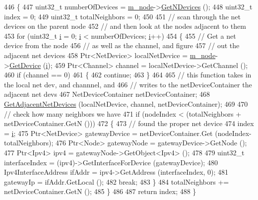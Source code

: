 \begin{DoxyCode}
446 \{
447   uint32\_t numberOfDevices = \hyperlink{classns3_1_1Ipv4NixVectorRouting_a329265b09f4d85bac6ec9bd0ec2daa92}{m\_node}->\hyperlink{classns3_1_1Node_a531554d2241ba4fa1cd74e3360be6bce}{GetNDevices} ();
448   uint32\_t index = 0;
449   uint32\_t totalNeighbors = 0;
450 
451   \textcolor{comment}{// scan through the net devices on the parent node}
452   \textcolor{comment}{// and then look at the nodes adjacent to them}
453   \textcolor{keywordflow}{for} (uint32\_t \hyperlink{bernuolliDistribution_8m_a6f6ccfcf58b31cb6412107d9d5281426}{i} = 0; \hyperlink{bernuolliDistribution_8m_a6f6ccfcf58b31cb6412107d9d5281426}{i} < numberOfDevices; \hyperlink{bernuolliDistribution_8m_a6f6ccfcf58b31cb6412107d9d5281426}{i}++)
454     \{
455       \textcolor{comment}{// Get a net device from the node}
456       \textcolor{comment}{// as well as the channel, and figure}
457       \textcolor{comment}{// out the adjacent net devices}
458       Ptr<NetDevice> localNetDevice = \hyperlink{classns3_1_1Ipv4NixVectorRouting_a329265b09f4d85bac6ec9bd0ec2daa92}{m\_node}->\hyperlink{classns3_1_1Node_a5918dfd24ef632efc9a83a5f6561c76e}{GetDevice} (\hyperlink{bernuolliDistribution_8m_a6f6ccfcf58b31cb6412107d9d5281426}{i});
459       Ptr<Channel> channel = localNetDevice->GetChannel ();
460       \textcolor{keywordflow}{if} (channel == 0)
461         \{
462           \textcolor{keywordflow}{continue};
463         \}
464 
465       \textcolor{comment}{// this function takes in the local net dev, and channnel, and}
466       \textcolor{comment}{// writes to the netDeviceContainer the adjacent net devs}
467       NetDeviceContainer netDeviceContainer;
468       \hyperlink{classns3_1_1Ipv4NixVectorRouting_a1037f3752d6583eca8cd83c72e0673ea}{GetAdjacentNetDevices} (localNetDevice, channel, netDeviceContainer);
469 
470       \textcolor{comment}{// check how many neighbors we have}
471       \textcolor{keywordflow}{if} (nodeIndex < (totalNeighbors + netDeviceContainer.GetN ()))
472         \{
473           \textcolor{comment}{// found the proper net device}
474           index = \hyperlink{bernuolliDistribution_8m_a6f6ccfcf58b31cb6412107d9d5281426}{i};
475           Ptr<NetDevice> gatewayDevice = netDeviceContainer.Get (nodeIndex-totalNeighbors);
476           Ptr<Node> gatewayNode = gatewayDevice->GetNode ();
477           Ptr<Ipv4> ipv4 = gatewayNode->GetObject<Ipv4> ();
478 
479           uint32\_t interfaceIndex = (ipv4)->GetInterfaceForDevice (gatewayDevice);
480           Ipv4InterfaceAddress ifAddr = ipv4->GetAddress (interfaceIndex, 0);
481           gatewayIp = ifAddr.GetLocal ();
482           \textcolor{keywordflow}{break};
483         \}
484       totalNeighbors += netDeviceContainer.GetN ();
485     \}
486 
487   \textcolor{keywordflow}{return} index;
488 \}
\end{DoxyCode}


